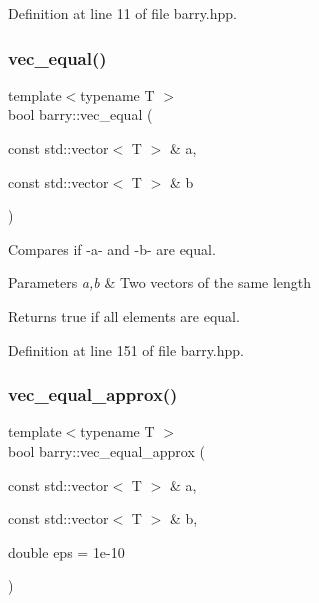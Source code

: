 Definition at line 11 of file barry.\+hpp.

\mbox{\label{namespacebarry_afbdb85734a7793890ea4268ea114858e}} 
\subsubsection{\texorpdfstring{vec\+\_\+equal()}{vec\_equal()}}
{\footnotesize\ttfamily template$<$typename T $>$ \\
bool barry\+::vec\+\_\+equal (\begin{DoxyParamCaption}\item[{const std\+::vector$<$ T $>$ \&}]{a,  }\item[{const std\+::vector$<$ T $>$ \&}]{b }\end{DoxyParamCaption})\hspace{0.3cm}{\ttfamily [inline]}}



Compares if -\/a-\/ and -\/b-\/ are equal. 


\begin{DoxyParams}{Parameters}
{\em a,b} & Two vectors of the same length \\
\hline
\end{DoxyParams}
\begin{DoxyReturn}{Returns}
{\ttfamily true} if all elements are equal. 
\end{DoxyReturn}


Definition at line 151 of file barry.\+hpp.

\mbox{\label{namespacebarry_a24c4bd4a99dd82edf66c2d3b645dca08}} 
\subsubsection{\texorpdfstring{vec\+\_\+equal\+\_\+approx()}{vec\_equal\_approx()}}
{\footnotesize\ttfamily template$<$typename T $>$ \\
bool barry\+::vec\+\_\+equal\+\_\+approx (\begin{DoxyParamCaption}\item[{const std\+::vector$<$ T $>$ \&}]{a,  }\item[{const std\+::vector$<$ T $>$ \&}]{b,  }\item[{double}]{eps = {\ttfamily 1e-\/10} }\end{DoxyParamCaption})\hspace{0.3cm}{\ttfamily [inline]}}



